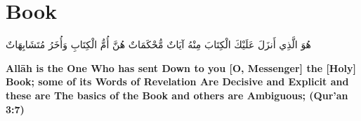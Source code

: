 \chapter{Book}
\begin{center}
    {\Huge    
        \begin{Arabic}
            هُوَ الَّذِي أَنزَلَ عَلَيْكَ الْكِتَابَ مِنْهُ آيَاتٌ مُّحْكَمَاتٌ هُنَّ أُمُّ الْكِتَابِ وَأُخَرُ مُتَشَابِهَاتٌ
        \end{Arabic}
    }    
\end{center}
\vspace*{\fill}
\vspace{3cm}
\begin{center}
    \large \textbf{Allāh is the One Who has sent Down to you [O, Messenger] the [Holy] Book; some of its Words of Revelation Are Decisive and Explicit and these are The basics of the Book and others are Ambiguous; (Qur'an 3:7)}
\end{center}
